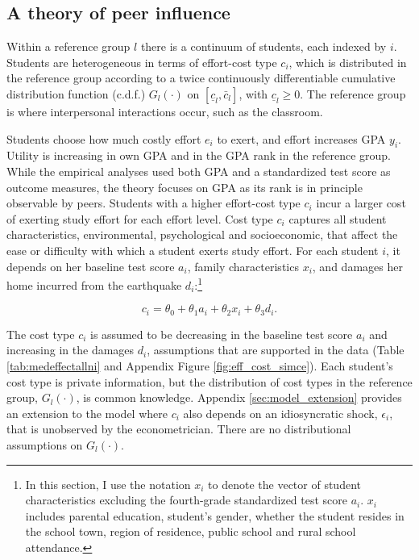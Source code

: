    
\subsection{A theory of peer influence }\label{sec:model1}

Within a reference group $l$ there is a continuum of students, each indexed by $i$. Students are heterogeneous in terms of effort-cost type $c_i$, which is distributed in the reference group according to a twice continuously differentiable cumulative distribution function (c.d.f.) $G_l(\cdot)$ on $[\underline{c}_l,\bar{c}_l]$, with $\underline{c}_l\geq 0$. The reference group is where interpersonal interactions occur, such as the classroom.\par 



Students choose how much costly effort $e_i$ to exert, and effort increases GPA $y_i$. Utility is increasing in own GPA and in the GPA rank in the reference group. While the empirical analyses used both GPA and a standardized test score as outcome measures, the theory focuses on GPA as its rank is in principle observable by peers. Students with a higher effort-cost type $c_i$ incur a larger cost of exerting study effort for each effort level. Cost type $c_i$ captures all student characteristics, environmental, psychological and socioeconomic, that affect the  ease or difficulty with which a student exerts study effort. For each student $i$, it depends on her baseline test score $a_i$, family characteristics $x_i$, and damages her home incurred from the earthquake $d_i$:\footnote{In this section, I use the notation $x_i$ to denote the vector of student characteristics excluding the fourth-grade standardized test score $a_i$. $x_i$ includes parental education, student's gender, whether the student resides in the school town, region of residence, public school and rural school attendance.}  \par 


\begin{equation}\label{eq:cost_effort}
    c_i=\theta_0+\theta_1 a_i+\theta_2  x_i + \theta_3  d_i.
    \end{equation}


\noindent The cost type $c_i$ is assumed to be decreasing in the baseline test score $a_i$ and increasing in the damages $d_i$, assumptions that are supported in the data  (Table \ref{tab:medeffectallni} and Appendix Figure \ref{fig:eff_cost_simce}). Each student's cost type is private information, but the distribution of cost types in the reference group, $G_l(\cdot)$, is common knowledge. Appendix \ref{sec:model_extension} provides an extension to the model where $c_i$ also depends on an idiosyncratic shock, $\epsilon_i$, that is unobserved by the econometrician. There are no distributional assumptions on $G_l(\cdot)$.\par 

